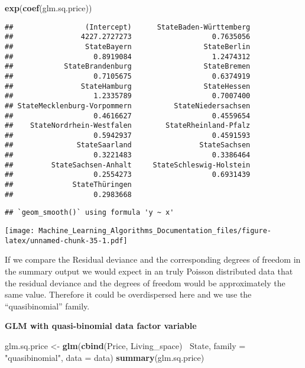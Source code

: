 \documentclass[
]{article}
\newenvironment{Shaded}{\begin{snugshade}}{\end{snugshade}}
\newcommand{\DataTypeTok}[1]{\textcolor[rgb]{0.13,0.29,0.53}{#1}}
\newcommand{\KeywordTok}[1]{\textcolor[rgb]{0.13,0.29,0.53}{\textbf{#1}}}
\newcommand{\NormalTok}[1]{#1}
\newcommand{\OperatorTok}[1]{\textcolor[rgb]{0.81,0.36,0.00}{\textbf{#1}}}
\newcommand{\StringTok}[1]{\textcolor[rgb]{0.31,0.60,0.02}{#1}}
\begin{document}
\begin{Shaded}
\begin{Highlighting}[]
\KeywordTok{exp}\NormalTok{(}\KeywordTok{coef}\NormalTok{(glm.sq.price))}
\end{Highlighting}
\end{Shaded}

\begin{verbatim}
##                 (Intercept)      StateBaden-Württemberg 
##                4227.2727273                   0.7635056 
##                 StateBayern                 StateBerlin 
##                   0.8919084                   1.2474312 
##            StateBrandenburg                 StateBremen 
##                   0.7105675                   0.6374919 
##                StateHamburg                 StateHessen 
##                   1.2335789                   0.7007400 
## StateMecklenburg-Vorpommern          StateNiedersachsen 
##                   0.4616627                   0.4559654 
##    StateNordrhein-Westfalen        StateRheinland-Pfalz 
##                   0.5942937                   0.4591593 
##               StateSaarland                StateSachsen 
##                   0.3221483                   0.3386464 
##         StateSachsen-Anhalt     StateSchleswig-Holstein 
##                   0.2554273                   0.6931439 
##              StateThüringen 
##                   0.2983668
\end{verbatim}

\begin{verbatim}
## `geom_smooth()` using formula 'y ~ x'
\end{verbatim}

\texttt{[image: Machine\_Learning\_Algorithms\_Documentation\_files/figure-latex/unnamed-chunk-35-1.pdf]}

If we compare the Residual deviance and the corresponding degrees of
freedom in the summary output we would expect in an truly Poisson
distributed data that the residual deviance and the degrees of freedom
would be approximately the same value. Therefore it could be
overdispersed here and we use the ``quasibinomial'' family.

\textbf{GLM with quasi-binomial data factor variable}

\begin{Shaded}
\begin{Highlighting}[]
\NormalTok{glm.sq.price <-}\StringTok{ }\KeywordTok{glm}\NormalTok{(}\KeywordTok{cbind}\NormalTok{(Price, Living_space)}\OperatorTok{~}\StringTok{ }\NormalTok{State,}
                    \DataTypeTok{family =} \StringTok{"quasibinomial"}\NormalTok{,}
                    \DataTypeTok{data =}\NormalTok{ data)}
\KeywordTok{summary}\NormalTok{(glm.sq.price)}
\end{Highlighting}
\end{Shaded}
\end{document}
